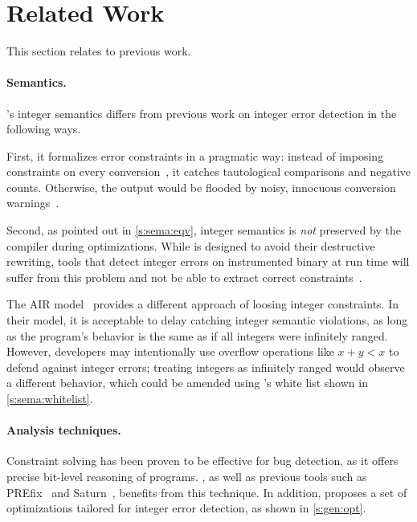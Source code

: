 \section{Related Work}
\label{s:relwk}

This section relates \sys to previous work.

\paragraph{Semantics.}
\sys's integer semantics differs from previous work on integer error
detection in the following ways.

First, it formalizes error constraints in a pragmatic way: instead
of imposing constraints on every conversion~\cite{brumley:rich,
moy:prefix}, it catches tautological comparisons and negative counts.
Otherwise, the output would be flooded by noisy, innocuous
conversion warnings~\cite{moy:prefix}.

Second, as pointed out in \autoref{s:sema:eqv}, integer semantics
is \emph{not} preserved by the compiler during optimizations.  While
\sys is designed to avoid their destructive rewriting, tools that
detect integer errors on instrumented binary at run time will suffer
from this problem and not be able to extract correct
constraints~\cite{molnar:catchconv, intscope}.

The AIR model~\cite{air} provides a different approach of loosing
integer constraints.  In their model, it is acceptable to delay
catching integer semantic violations, as long as the program's
behavior is the same as if all integers were infinitely ranged.
However, developers may intentionally use overflow operations like
$x + y < x$ to defend against integer errors; treating integers as
infinitely ranged would observe a different behavior, which could
be amended using \sys's white list shown in \autoref{s:sema:whitelist}.

\paragraph{Analysis techniques.}

Constraint solving has been proven to be effective for bug detection,
as it offers precise bit-level reasoning of programs.  \sys, as
well as previous tools such as PREfix~\cite{moy:prefix} and
Saturn~\cite{xie:saturn}, benefits from this technique.  In addition,
\sys proposes a set of optimizations tailored for integer error
detection, as shown in \autoref{s:gen:opt}.

